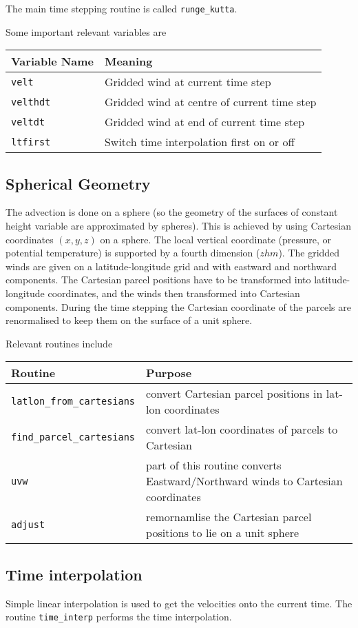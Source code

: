 \documentclass[a4paper]{article}
\begin{document}
The main time stepping routine is called {\tt runge\_kutta}.

Some important relevant variables are

\begin{tabular}{|l|l|}
\hline
Variable Name & Meaning \\
\hline
{\tt velt} & Gridded wind at current time step \\
{\tt velthdt} & Gridded wind at centre of current time step \\
{\tt veltdt} & Gridded wind at end of current time step \\
{\tt ltfirst} & Switch time interpolation first on or off \\
\hline
\end{tabular}

\subsection{Spherical Geometry}
The advection is done on a sphere (so the geometry of the surfaces of
constant height variable are approximated by spheres).  This is
achieved by using Cartesian coordinates $(x,y,z)$ on a sphere.  The
local vertical coordinate (pressure, or potential temperature) is
supported by a fourth dimension ($zhm$).  The gridded winds are given
on a latitude-longitude grid and with eastward and northward
components.  The Cartesian parcel positions have to be transformed
into latitude-longitude coordinates, and the winds then transformed
into Cartesian components. During the time stepping the Cartesian
coordinate of the parcels are renormalised to keep them on the surface
of a unit sphere.

Relevant routines include

\begin{tabular}{|l|p{15pc}|}
\hline
Routine & Purpose \\
\hline
{\tt latlon\_from\_cartesians} & convert Cartesian parcel positions in
lat-lon coordinates \\
{\tt find\_parcel\_cartesians} & convert lat-lon coordinates of parcels
to Cartesian \\
{\tt uvw} & part of this routine converts Eastward/Northward winds to
Cartesian coordinates\\
{\tt adjust} & remornamlise the Cartesian parcel positions to lie on a
unit sphere \\
\hline
\end{tabular}

\subsection{Time interpolation}
Simple linear interpolation is used to get the velocities onto the
current time.  The routine {\tt time\_interp} performs the time
interpolation.
\end{document}
